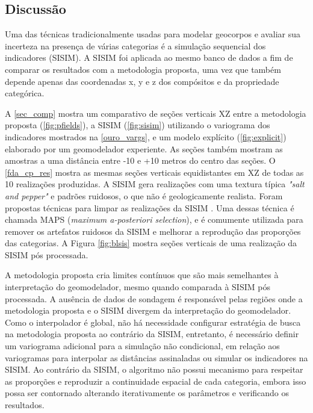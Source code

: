 \subsection{Discussão}

Uma das técnicas tradicionalmente usadas para modelar geocorpos e avaliar sua incerteza na presença de várias categorias é a simulação sequencial dos indicadores (SISIM). A SISIM foi aplicada ao mesmo banco de dados a fim de comparar os resultados com a metodologia proposta, uma vez que também depende apenas das coordenadas x, y e z dos compósitos e da propriedade categórica.

A \autoref{sec_comp} mostra um comparativo de seções verticais XZ entre a metodologia proposta (\autoref{fig:pfields}), a SISIM (\autoref{fig:sisim}) utilizando o variograma dos indicadores mostrados na \autoref{ouro_vargs}, e um modelo explícito (\autoref{fig:explicit}) elaborado por um geomodelador experiente. As seções também mostram as amostras a uma distância entre -10 e +10 metros do centro das seções. O \autoref{fda_cp_res} mostra as mesmas seções verticais equidistantes em XZ de todas as 10 realizações produzidas. A SISIM gera realizações com uma textura típica \textit{"salt and pepper"} e padrões ruidosos, o que não é geologicamente realista. Foram propostas técnicas para limpar as realizações da SISIM \cite{DEUTSCH1998551, yamamoto2015post}. Uma dessas técnica é chamada MAPS (\textit{maximum a-posteriori selection}), e é comumente utilizada para remover os artefatos ruidosos da SISIM e melhorar a reprodução das proporções das categorias. A Figura \autoref{fig:blsis} mostra seções verticais de uma realização da SISIM pós processada.

A metodologia proposta cria limites contínuos que são mais semelhantes à interpretação do geomodelador, mesmo quando comparada à SISIM pós processada. A ausência de dados de sondagem é responsável pelas regiões onde a metodologia proposta e o SISIM divergem da interpretação do geomodelador. Como o interpolador é global, não há necessidade configurar estratégia de busca na metodologia proposta ao contrário da SISIM, entretanto, é necessário definir um variograma adicional para a simulação não condicional, em relação aos variogramas para interpolar as distâncias assinaladas ou simular os indicadores na SISIM. Ao contrário da SISIM, o algoritmo não possui mecanismo para respeitar as proporções e reproduzir a continuidade espacial de cada categoria, embora isso possa ser contornado alterando iterativamente os parâmetros e verificando os resultados.

